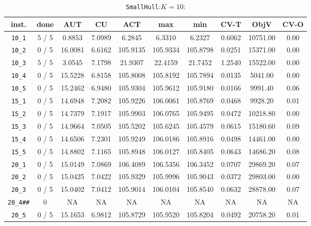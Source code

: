 \begin{table}[h!]
\begin{center}
\small
\begin{tabular}{| c | c | c | c | c | c | c | c | c | c |}
\hline
inst. & done & AUT & CU & ACT & max & min & CV-T & ObjV & CV-O \\
\hline
\verb|10_1| & 5 / 5 & 0.8853 & 7.0989 & 6.2845 & 6.3310 & 6.2327 & 0.6062 & 10751.00 & 0.00\\ 
\verb|10_2| & 0 / 5 & 16.0081 & 6.6162 & 105.9135 & 105.9334 & 105.8798 & 0.0251 & 15371.00 & 0.00\\ 
\verb|10_3| & 5 / 5 & 3.0545 & 7.1798 & 21.9307 & 22.4159 & 21.7452 & 1.2540 & 15522.00 & 0.00\\ 
\verb|10_4| & 0 / 5 & 15.5228 & 6.8158 & 105.8008 & 105.8192 & 105.7894 & 0.0135 & 5041.00 & 0.00\\ 
\verb|10_5| & 0 / 5 & 15.2462 & 6.9480 & 105.9304 & 105.9612 & 105.9180 & 0.0166 & 9991.40 & 0.06\\ 
\verb|15_1| & 0 / 5 & 14.6948 & 7.2082 & 105.9226 & 106.0061 & 105.8769 & 0.0468 & 9928.20 & 0.01\\ 
\verb|15_2| & 0 / 5 & 14.7379 & 7.1917 & 105.9903 & 106.0765 & 105.9495 & 0.0472 & 10218.80 & 0.00\\ 
\verb|15_3| & 0 / 5 & 14.9664 & 7.0505 & 105.5202 & 105.6245 & 105.4579 & 0.0615 & 15180.60 & 0.09\\ 
\verb|15_4| & 0 / 5 & 14.6506 & 7.2301 & 105.9249 & 106.0186 & 105.8916 & 0.0498 & 14461.00 & 0.00\\ 
\verb|15_5| & 0 / 5 & 14.8802 & 7.1165 & 105.8948 & 106.0127 & 105.8405 & 0.0643 & 14686.20 & 0.08\\ 
\verb|20_1| & 0 / 5 & 15.0149 & 7.0869 & 106.4089 & 106.5356 & 106.3452 & 0.0707 & 29869.20 & 0.07\\ 
\verb|20_2| & 0 / 5 & 15.0425 & 7.0422 & 105.9329 & 105.9996 & 105.9043 & 0.0372 & 29803.00 & 0.00\\ 
\verb|20_3| & 0 / 5 & 15.0402 & 7.0412 & 105.9014 & 106.0104 & 105.8540 & 0.0632 & 28878.00 & 0.07\\ 
\verb|20_4##| & 0 & NA & NA & NA & NA & NA & NA & NA & NA \\ 
\verb|20_5| & 0 / 5 & 15.1653 & 6.9812 & 105.8729 & 105.9520 & 105.8204 & 0.0492 & 20758.20 & 0.01\\ 
\hline
\end{tabular}
\caption{\texttt{SmallHull}:$K=10$: }
\label{table:hull:10}
\end{center}
\end{table}

